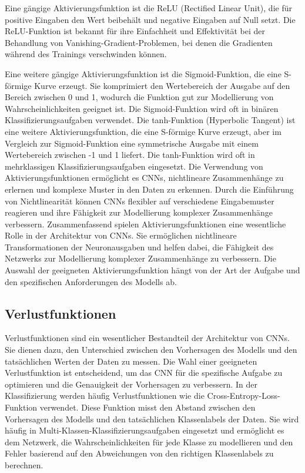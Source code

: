     Eine gängige Aktivierungsfunktion ist die ReLU (Rectified Linear Unit), die für positive Eingaben den Wert beibehält und negative Eingaben auf Null setzt. 
    Die ReLU-Funktion ist bekannt für ihre Einfachheit und Effektivität bei der Behandlung von Vanishing-Gradient-Problemen, bei denen die Gradienten während des Trainings verschwinden können.

    Eine weitere gängige Aktivierungsfunktion ist die Sigmoid-Funktion, die eine S-förmige Kurve erzeugt. 
    Sie komprimiert den Wertebereich der Ausgabe auf den Bereich zwischen 0 und 1, wodurch die Funktion gut zur Modellierung von Wahrscheinlichkeiten geeignet ist. 
    Die Sigmoid-Funktion wird oft in binären Klassifizierungsaufgaben verwendet.    
    Die tanh-Funktion (Hyperbolic Tangent) ist eine weitere Aktivierungsfunktion, die eine S-förmige Kurve erzeugt, aber im Vergleich zur Sigmoid-Funktion eine symmetrische Ausgabe mit einem Wertebereich zwischen -1 und 1 liefert. 
    Die tanh-Funktion wird oft in mehrklassigen Klassifizierungsaufgaben eingesetzt.    
    Die Verwendung von Aktivierungsfunktionen ermöglicht es \acp{CNN}, nichtlineare Zusammenhänge zu erlernen und komplexe Muster in den Daten zu erkennen. 
    Durch die Einführung von Nichtlinearität können \acp{CNN} flexibler auf verschiedene Eingabemuster reagieren und ihre Fähigkeit zur Modellierung komplexer Zusammenhänge verbessern.    
    Zusammenfassend spielen Aktivierungsfunktionen eine wesentliche Rolle in der Architektur von \acp{CNN}. 
    Sie ermöglichen nichtlineare Transformationen der Neuronausgaben und helfen dabei, die Fähigkeit des Netzwerks zur Modellierung komplexer Zusammenhänge zu verbessern. 
    Die Auswahl der geeigneten Aktivierungsfunktion hängt von der Art der Aufgabe und den spezifischen Anforderungen des Modells ab.

\subsection{Verlustfunktionen}

    Verlustfunktionen sind ein wesentlicher Bestandteil der Architektur von \acfp{CNN}. 
    Sie dienen dazu, den Unterschied zwischen den Vorhersagen des Modells und den tatsächlichen Werten der Daten zu messen. 
    Die Wahl einer geeigneten Verlustfunktion ist entscheidend, um das \ac{CNN} für die spezifische Aufgabe zu optimieren und die Genauigkeit der Vorhersagen zu verbessern.
    In der Klassifizierung werden häufig Verlustfunktionen wie die Cross-Entropy-Loss-Funktion verwendet. 
    Diese Funktion misst den Abstand zwischen den Vorhersagen des Modells und den tatsächlichen Klassenlabels der Daten. Sie wird häufig in Multi-Klassen-Klassifizierungsaufgaben eingesetzt und ermöglicht es dem Netzwerk, die Wahrscheinlichkeiten für jede Klasse zu modellieren und den Fehler basierend auf den Abweichungen von den richtigen Klassenlabels zu berechnen.

